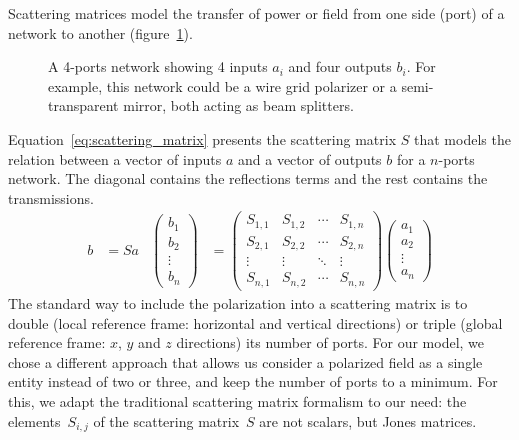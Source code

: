 \documentclass[a4paper,11pt]{article}
\begin{document}
Scattering matrices \cite{siegman1986lasers} model the transfer of power or field from one side (port) of a network to another (figure~\ref{fig:ports}).
\begin{figure}[hbtp]
    \centering
    
    \caption{\label{fig:ports}A 4-ports network showing 4 inputs $a_i$ and four outputs $b_i$.  For example, this network could be a wire grid polarizer or a semi-transparent mirror, both acting as beam splitters.}
\end{figure}
Equation~\ref{eq:scattering_matrix} presents the scattering matrix $S$ that models the relation between a vector of inputs $a$ and a vector of outputs $b$ for a $n$-ports network.
The diagonal contains the reflections terms and the rest contains the transmissions.
\begin{align}
    b &= S a
    &
    \begin{pmatrix}
        b_1\\
        b_2\\
        \vdots\\
        b_n
    \end{pmatrix}
    &=
    \begin{pmatrix}
        S_{1, 1} & S_{1, 2} & \cdots & S_{1, n} \\
        S_{2, 1} & S_{2, 2} & \cdots & S_{2, n} \\
        \vdots   & \vdots   & \ddots & \vdots   \\
        S_{n, 1} & S_{n, 2} & \cdots & S_{n, n}
    \end{pmatrix}
    \begin{pmatrix}
        a_1\\
        a_2\\
        \vdots\\
        a_n
    \end{pmatrix}
    \label{eq:scattering_matrix}
\end{align}
The standard way to include the polarization into a scattering matrix is to double (local reference frame: horizontal and vertical directions) or triple (global reference frame: $x$, $y$ and $z$ directions) its number of ports.
For our model, we chose a different approach that allows us consider a polarized field as a single entity instead of two or three, and keep the number of ports to a minimum.
For this, we adapt the traditional scattering matrix formalism to our need:
the elements~$S_{i, j}$ of the scattering matrix~$S$ are not scalars, but Jones matrices.
\end{document}
